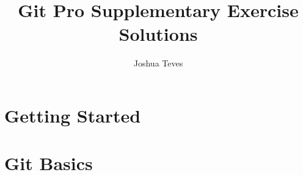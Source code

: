 \documentclass{report}
\title{Git Pro Supplementary Exercise Solutions}
\author{Joshua Teves}
\begin{document}
\maketitle

\chapter{Getting Started}


\chapter{Git Basics}

\end{document}
